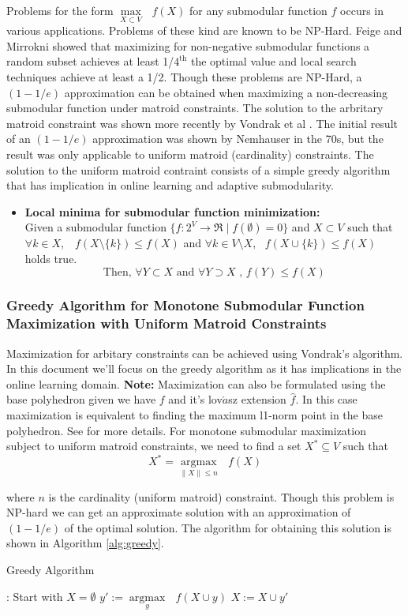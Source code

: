 Problems for the form $\underset{X\subset V}{\operatorname{max }}\text{ } f(X)$ for any submodular function $f$ occurs in various applications. Problems of these kind are known to be NP-Hard. Feige and Mirrokni \cite{Feige07maximizingnon-monotone} showed that maximizing for non-negative submodular functions a random subset achieves at least 1/$4^{\text{th}}$ the optimal value and local search techniques achieve at least a 1/2. Though these problems are NP-Hard, a $(1 - 1/e)$ approximation can be obtained when maximizing a non-decreasing submodular function under matroid constraints.
The solution to the arbritary matroid constraint was shown more recently by Vondrak et al \cite{Vondrak}. The initial result of an $(1 - 1/e)$ approximation was shown by Nemhauser  \cite{Nemhauser} in the 70s, but the result was only applicable to uniform matroid (cardinality) constraints. The solution to the uniform matroid contraint consists of a simple greedy algorithm that has implication in online learning and adaptive submodularity.
\begin{itemize}
 \item {\bf \lemma Local minima for submodular function minimization:} \\ Given a submodular function $\{f:2^V \rightarrow \Re \mid f(\emptyset) = 0\}$ and  $X \subset V$ such that $\forall k \in X$, $\text{ }f(X\setminus \{k\}) \leq f(X)$  and $\forall k \in V\setminus X, \text{ } f(X\cup \{k\}) \leq f(X)$ holds true.
 \[ \text{Then, } \forall Y\subset X \text{ and } \forall Y\supset X \text{ , }f(Y) \leq f(X) \] 
\end{itemize}
\subsubsection{Greedy Algorithm for Monotone Submodular Function Maximization with Uniform Matroid Constraints}
Maximization for arbitary constraints can be achieved using Vondrak's algorithm. In this document we'll focus on the greedy algorithm as it has implications in the online learning domain. {\bf Note:} Maximization can also be formulated using the base polyhedron given we have $f$ and it's lov$\acute{a}$sz extension $\hat{f}$. In this case maximization is equivalent to finding the maximum l1-norm point in the base polyhedron. See \cite{Bach} for more details.
For monotone submodular maximization subject to uniform matroid constraints, we need to find a set $X^*\subseteq V$ such that
\[
 X^* = \underset{\|X\| \leq n}{\operatorname{argmax }}\text{ }f(X)
\]

where $n$ is the cardinality (uniform matroid) constraint. Though this problem is NP-hard we can get an approximate solution with an approximation of $(1-1/e)$ of the optimal solution.  The algorithm for obtaining this solution is shown in Algorithm \ref{alg:greedy}.
\begin{algorithm}[htb]
\caption{Greedy Algorithm}
\label{alg:greedy}
\begin{algorithmic}[1]
\footnotesize
{}: Start with $X = \emptyset$
  \State $y':= \underset{y}{\operatorname{argmax }}\text{ }f(X\cup {y}) $
  \State $X := X \cup {y'}$
\EndFor
\end{algorithmic}
\end{algorithm}
